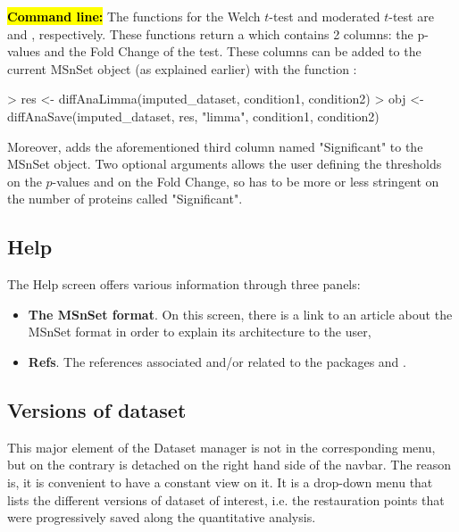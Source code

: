 \documentclass[12pt]{article}
\begin{document}
\hl{\bf Command line:} The  functions for the Welch $t$-test 
and moderated $t$-test are  and 
, respectively. These functions return a 
 which contains 2 columns: the p-values and the Fold Change 
of the test. These columns can be added to the current MSnSet object 
 (as explained earlier) with the function 
:
\begin{Schunk}
\begin{Sinput}
> res <- diffAnaLimma(imputed_dataset, condition1, condition2)
> obj <- diffAnaSave(imputed_dataset, res, "limma", condition1, condition2)
\end{Sinput}
\end{Schunk}
Moreover,  adds the aforementioned third column 
named "Significant" to the MSnSet object. Two optional arguments allows the 
user defining the thresholds on the $p$-values and on the Fold Change, so has 
to be more or less stringent on the number of proteins called "Significant".





\subsection{Help}
The Help screen offers various information through three panels:
\begin{itemize}
\item\textbf{{The MSnSet format}}. On this screen, there is a link to an 
article about the MSnSet format in order to explain its architecture to the 
user,
\item\textbf{{Refs}}. The references associated and/or related to the 
packages  and .
\end{itemize}


\subsection{Versions of dataset}\label{sec:availabledatasets}
This major element of the Dataset manager is not in the corresponding menu, 
but on the contrary is detached on the right hand side of the navbar. The 
reason is,  it is convenient to have a constant view on it. It is a drop-down 
menu that lists the different versions of dataset of interest, i.e. the 
restauration points that were progressively saved along the quantitative 
analysis. 
\end{document}
